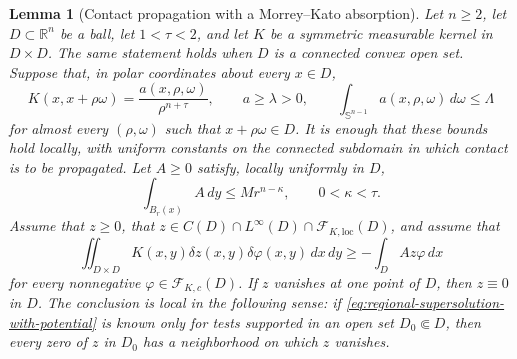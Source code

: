 \documentclass[11pt,reqno]{amsart}
\numberwithin{equation}{section}
\newcommand{\R}{\mathbb R}
\newcommand{\dd}{\,d}
\newtheorem{lemma}[theorem]{Lemma}
\theoremstyle{remark}
\begin{document}
\begin{lemma}[Contact propagation with a Morrey--Kato absorption]
\label{lem:kato-contact-propagation}
Let \(n\ge2\), let \(D\subset\R^n\) be a ball, let
\(1<\tau<2\), and let \(K\) be a symmetric measurable kernel in
\(D\times D\).  The same statement holds when \(D\) is a connected
convex open set.  Suppose that, in polar coordinates about every
$x\in D$,
\begin{equation}
 K(x,x+\rho\omega)
 =\frac{a(x,\rho,\omega)}{\rho^{n+\tau}},
 \qquad
 a\ge\lambda>0,\qquad
 \int_{\mathbb S^{n-1}}a(x,\rho,\omega)\dd\omega\le\Lambda
 \label{eq:spectral-regional-bounds}
\end{equation}
for almost every \((\rho,\omega)\) such that
\(x+\rho\omega\in D\).
It is enough that these bounds hold locally, with uniform constants on
the connected subdomain in which contact is to be propagated.
Let $A\ge0$ satisfy, locally uniformly in $D$,
\begin{equation}
 \int_{B_r(x)}A\dd y\le M r^{n-\kappa},
 \qquad 0<\kappa<\tau.
 \label{eq:morrey-absorption}
\end{equation}
Assume that \(z\ge0\), that
\(z\in C(D)\cap L^\infty(D)\cap\mathcal F_{K,\mathrm{loc}}(D)\), and
assume that
\begin{equation}
 \iint_{D\times D}K(x,y)\delta z(x,y)\delta\varphi(x,y)
 \dd x\!\dd y
 \ge-\int_DAz\varphi\dd x
 \label{eq:regional-supersolution-with-potential}
\end{equation}
for every nonnegative
\(\varphi\in\mathcal F_{K,c}(D)\).  If $z$ vanishes at one
point of $D$, then $z\equiv0$ in $D$.
The conclusion is local in the following sense: if
\eqref{eq:regional-supersolution-with-potential} is known only for tests
supported in an open set \(D_0\Subset D\), then every zero of \(z\) in
\(D_0\) has a neighborhood on which \(z\) vanishes.
\end{lemma}
\end{document}
